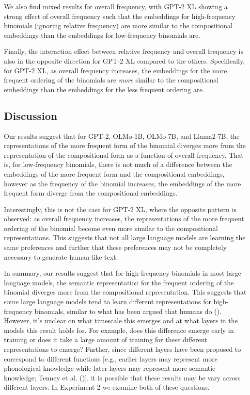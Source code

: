 \documentclass[
  12pt,
  letterpaper,
]{scrreprt}
\begin{document}
We also find mixed results for overall frequency, with GPT-2 XL showing
a strong effect of overall frequency such that the embeddings for
high-frequency binomials (ignoring relative frequency) are more similar
to the compositional embeddings than the embeddings for low-frequency
binomials are.

Finally, the interaction effect between relative frequency and overall
frequency is also in the opposite direction for GPT-2 XL compared to the
others. Specifically, for GPT-2 XL, as overall frequency increases, the
embeddings for the more frequent ordering of the binomials are
\emph{more} similar to the compositional embeddings than the embeddings
for the less frequent ordering are.

\subsection{Discussion}\label{discussion-8}

Our results suggest that for GPT-2, OLMo-1B, OLMo-7B, and Llama2-7B, the
representations of the more frequent form of the binomial diverges more
from the representation of the compositional form as a function of
overall frequency. That is, for low-frequency binomials, there is not
much of a difference between the embeddings of the more frequent form
and the compositional embeddings, however as the frequency of the
binomial increases, the embeddings of the more frequent form diverge
from the compositional embeddings.

Interestingly, this is not the case for GPT-2 XL, where the opposite
pattern is observed: as overall frequency increases, the representations
of the more frequent ordering of the binomial become even more similar
to the compositional representations. This suggests that not all large
language models are learning the same preferences and further that these
preferences may not be completely necessary to generate human-like text.

In summary, our results suggest that for high-frequency binomials in
most large language models, the semantic representation for the frequent
ordering of the binomial diverges more from the compositional
representation. This suggests that some large language models tend to
learn different representations for high-frequency binomials, similar to
what has been argued that humans do
(). However, it's unclear on what timescale this emerges and at
what layers in the models this result holds for. For example, does this
difference emerge early in training or does it take a large amount of
training for these different representations to emerge? Further, since
different layers have been proposed to correspond to different functions
{[}e.g., earlier layers may represent more phonological knowledge while
later layers may represent more semantic knowledge; Tenney et al.
(){]}, it is
possible that these results may be vary across different layers. In
Experiment 2 we examine both of these questions.
\end{document}
